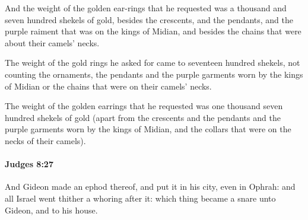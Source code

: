 			\begin{versebox}
					\item[BHS] 
					\item[ASV] And the weight of the golden ear-rings that he requested was a thousand and seven hundred shekels of gold, besides the crescents, and the pendants, and the purple raiment that was on the kings of Midian, and besides the chains that were about their camels' necks.
					\item[NIV] The weight of the gold rings he asked for came to seventeen hundred shekels, not counting the ornaments, the pendants and the purple garments worn by the kings of Midian or the chains that were on their camels’ necks.
					\item[NRSV] The weight of the golden earrings that he requested was one thousand seven hundred shekels of gold (apart from the crescents and the pendants and the purple garments worn by the kings of Midian, and the collars that were on the necks of their camels).
			\end{versebox}

		\paragraph{Judges 8:27} %
			\label{JUDGES-8-27}

			And Gideon made an ephod thereof, and put it in his city, even in Ophrah: and all Israel went thither a whoring after it: which thing became a snare unto Gideon, and to his house.

